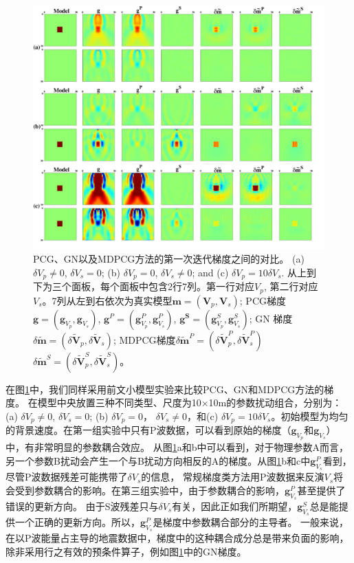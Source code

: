 \begin{figure}[!htb]
    \begin{center}
        \includegraphics[width=14cm]{Figure/chapter02/Hessiantest/Fig/newepsall.pdf}
        \caption{
			PCG、GN以及MDPCG方法的第一次迭代梯度之间的对比。
    (a) $\delta V_p \neq 0$, $\delta V_s=0$; (b) $\delta V_p=0$, $\delta V_s\neq0$; and (c)
    $\delta V_p=10 \delta V_s$.
	从上到下为三个面板，每个面板中包含2行7列。第一行对应$V_p$,
	第二行对应$V_s$。7列从左到右依次为真实模型$\mathbf{m}=(\mathbf{V}_p,
    \mathbf{V}_s)$;
    PCG梯度$\mathbf{g}=(\mathbf{g}_{V_p},\mathbf{g}_{V_s})$,
    $\mathbf{g}^P=(\mathbf{g}^P_{V_p},\mathbf{g}^P_{V_s})$,
    $\mathbf{g^S}=(\mathbf{g}^S_{V_p},\mathbf{g}^S_{V_s})$;
    GN 梯度$\delta
    \tilde{\mathbf{m}}=(\delta\tilde{\mathbf{V}}_p,\delta\tilde{\mathbf{V}}_s)$;
        MDPCG梯度$\delta
        \tilde{\mathbf{m}}^P=(\delta\tilde{\mathbf{V}}^P_p,\delta\tilde{\mathbf{V}}^P_s)$
         $\delta
        \tilde{\mathbf{m}}^S=(\delta\tilde{\mathbf{V}}^S_p,\delta\tilde{\mathbf{V}}^S_s)$。
    }
    \label{fig:all}
    \end{center}
\end{figure}

在图\ref{fig:all}中，我们同样采用前文小模型实验来比较PCG、GN和MDPCG方法的梯度。
在模型中央放置三种不同类型、尺度为10$\times$10m的参数扰动组合，分别为：(a) $\delta V_p \neq 0$, $\delta V_s = 0$; (b) $\delta V_p = 0$，
$\delta V_s \neq 0$，和(c) $\delta V_p =10\delta
V_s$。初始模型为均匀的背景速度。在第一组实验中只有P波数据，可以看到原始的梯度（$\mathbf{g}_{V_p}$和$\mathbf{g}_{V_s}$）中，有非常明显的参数耦合效应。
从图\ref{fig:all}a和b中可以看到，对于物理参数A而言，另一个参数B扰动会产生一个与B扰动方向相反的A的梯度。从图\ref{fig:all}b和c中$\mathbf{g}^{P}_{V_s}$看到，尽管P波数据残差可能携带了$\delta V_s$的信息，
常规梯度类方法用P波数据来反演$V_s$将会受到参数耦合的影响。在第三组实验中，由于参数耦合的影响，$\mathbf{g}^P_{V_s}$甚至提供了错误的更新方向。
由于S波残差只与$\delta
V_s$有关，因此正如我们所期望，$\mathbf{g}^S_{V_s}$总是能提供一个正确的更新方向。所以，$\mathbf{g}^P_{V_s}$是梯度中参数耦合部分的主导者。
一般来说，在以P波能量占主导的地震数据中，梯度中的这种耦合成分总是带来负面的影响，除非采用行之有效的预条件算子，例如图\ref{fig:all}中的GN梯度。

